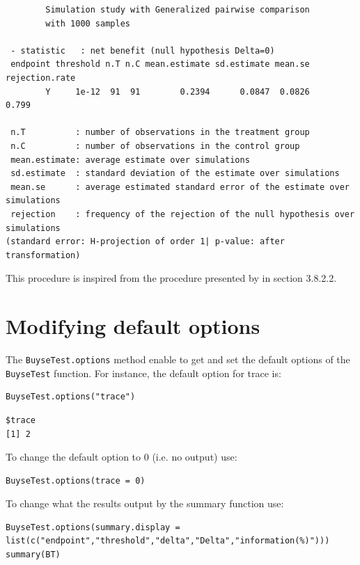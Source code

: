 \documentclass[12pt]{article}
\begin{document}
\begin{verbatim}
        Simulation study with Generalized pairwise comparison
        with 1000 samples

 - statistic   : net benefit (null hypothesis Delta=0)
 endpoint threshold n.T n.C mean.estimate sd.estimate mean.se rejection.rate
        Y     1e-12  91  91        0.2394      0.0847  0.0826          0.799

 n.T          : number of observations in the treatment group
 n.C          : number of observations in the control group
 mean.estimate: average estimate over simulations
 sd.estimate  : standard deviation of the estimate over simulations
 mean.se      : average estimated standard error of the estimate over simulations
 rejection    : frequency of the rejection of the null hypothesis over simulations
(standard error: H-projection of order 1| p-value: after transformation)
\end{verbatim}
This procedure is inspired from the procedure presented by
\cite{brunner2018rank} in section 3.8.2.2.


\clearpage

\section{Modifying default options}
\label{sec:org3baf946}
The \texttt{BuyseTest.options} method enable to get and set the default
options of the \texttt{BuyseTest} function. For instance, the default option
for trace is:
\lstset{language=r,label= ,caption= ,captionpos=b,numbers=none}
\begin{lstlisting}
BuyseTest.options("trace")
\end{lstlisting}

\begin{verbatim}
$trace
[1] 2
\end{verbatim}


To change the default option to 0 (i.e. no output) use:
\lstset{language=r,label= ,caption= ,captionpos=b,numbers=none}
\begin{lstlisting}
BuyseTest.options(trace = 0)
\end{lstlisting}

To change what the results output by the summary function use:
\lstset{language=r,label= ,caption= ,captionpos=b,numbers=none}
\begin{lstlisting}
BuyseTest.options(summary.display = list(c("endpoint","threshold","delta","Delta","information(%)")))
summary(BT)
\end{lstlisting}
\end{document}
